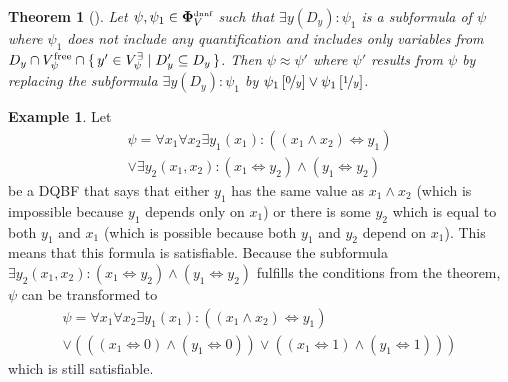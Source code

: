 \documentclass[
  digital, %
  twoside, %
  table,   %
  nolof,     %
  nolot,     %
]{fithesis3}
\let\setbuilder\set
\newcommand{\simpleset}[1]{\{{#1}\}}
\renewcommand{\set}[1]{\normalexpandarg\IfSubStr{#1}{|}{\setbuilder{#1}}{\simpleset{#1}}}
\newtheorem{theorem}{Theorem}[chapter] %
\theoremstyle{definition}
\newtheorem{example}{Example}
\theoremstyle{remark}
\newcommand{\substitute}[2]{\left[ \nicefrac{#2}{#1} \right]}
\newcommand{\DQBF}[1]{\mathbf{\Phi}_{#1}^{\text{\tiny dnnf}}}
\newcommand{\lequal}{\Leftrightarrow}
\begin{document}
\begin{theorem}[{\cite[Theorem 5]{HQSquantifierLocalization}}]
  Let $\psi, \psi_1 \in \DQBF{V}$ such that $\exists y(D_y) : \psi_1$ is a subformula of $\psi$ where $\psi_1$ does not include any quantification and includes only variables from $D_y \cap V_{\psi}^{\text{free}} \cap \set{y' \in V_{\psi}^{\exists} | D_y' \subseteq D_y}$. Then $\psi \approx \psi'$ where $\psi'$ results from $\psi$ by replacing the subformula $\exists y(D_y) : \psi_1$ by $\psi_1\substitute{y}{0} \lor \psi_1\substitute{y}{1}$.
\end{theorem}
\begin{example}
Let
\begin{multline*}
\psi = \forall x_1 \forall x_2 \exists y_1(x_1) : ((x_1 \land x_2) \lequal y_1)\\
\lor \exists y_2 (x_1,x_2) : (x_1 \lequal y_2) \land (y_1 \lequal y_2)
\end{multline*}
be a DQBF that says that either $y_1$ has the same value as $x_1 \land x_2$ (which is impossible because $y_1$ depends only on $x_1$) or there is some $y_2$ which is equal to both $y_1$ and $x_1$ (which is possible because both $y_1$ and $y_2$ depend on $x_1$). This means that this formula is satisfiable. Because the subformula $\exists y_2 (x_1,x_2) : (x_1 \lequal y_2) \land (y_1 \lequal y_2)$ fulfills the conditions from the theorem, $\psi$ can be transformed to
\begin{multline*}
\psi = \forall x_1 \forall x_2 \exists y_1(x_1) : ((x_1 \land x_2) \lequal y_1)\\
\lor (((x_1 \lequal 0) \land (y_1 \lequal 0)) \lor ((x_1 \lequal 1) \land (y_1 \lequal 1)))
\end{multline*}
which is still satisfiable.
\end{example}



\end{document}
